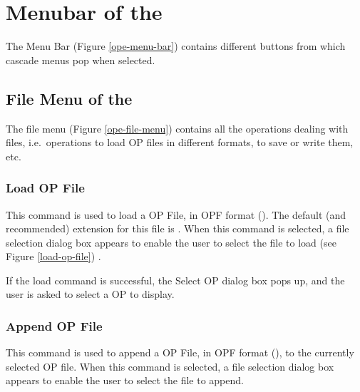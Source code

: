 \section{Menubar of the \OPE{}}


The Menu Bar (Figure \ref{ope-menu-bar}) contains different buttons from
which cascade menus pop when selected.



\subsection{File Menu of the \OPE{}}


The file menu (Figure \ref{ope-file-menu}) contains all the operations dealing
with files, i.e.\ operations to load OP files in different formats, to save or
write them, etc.



\subsubsection{Load OP File}


This command is used to load a OP File, in OPF format ().
The default (and recommended) extension for this file is  .  When
this command is selected, a file selection dialog box appears to enable the
user to select the file to load (see Figure \ref{load-op-file}) .

If the load command is successful, the Select OP dialog box pops up,
and the user is asked to select a OP to display.

\subsubsection{Append OP File}

This command is used to append a OP File, in OPF format (),
to the currently selected OP file. When this command is selected, a file
selection dialog box appears to enable the user to select the file to append.

